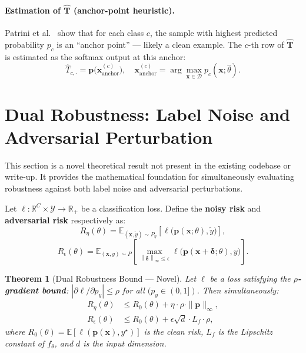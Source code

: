 \documentclass[11pt,a4paper]{article}
\newtheorem{theorem}{Theorem}[section]
\newcommand{\R}{\mathbb{R}}
\newcommand{\E}{\mathbb{E}}
\newcommand{\norm}[1]{\left\|#1\right\|}
\newcommand{\abs}[1]{\left|#1\right|}
\newcommand{\pb}{\mathbf{p}}
\newcommand{\xb}{\mathbf{x}}
\newcommand{\Tb}{\mathbf{T}}
\begin{document}
\paragraph{Estimation of $\hat{\Tb}$ (anchor-point heuristic).}
Patrini et al.\ \cite{patrini2017} show that for each class $c$, the sample with
highest predicted probability $p_c$ is an ``anchor point'' — likely a clean example.
The $c$-th row of $\hat{\Tb}$ is estimated as the softmax output at this anchor:
\[
  \hat T_{c,\cdot} = \pb\big(\xb^{(c)}_{\mathrm{anchor}}\big), \quad
  \xb^{(c)}_{\mathrm{anchor}} = \arg\max_{\xb \in \mathcal{D}} p_c(\xb;\hat\theta).
\]

\section{Dual Robustness: Label Noise and Adversarial Perturbation}
\label{sec:dual}

\begin{tcolorbox}[colback=green!5!white,colframe=green!60!black,title=Novel Contribution]
This section is a novel theoretical result not present in the existing codebase
or write-up. It provides the mathematical foundation for simultaneously evaluating
robustness against both label noise and adversarial perturbations.
\end{tcolorbox}

Let $\ell : \R^C \times \mathcal{Y} \to \R_+$ be a classification loss.
Define the \textbf{noisy risk} and \textbf{adversarial risk} respectively as:
\[
  R_\eta(\theta) = \E_{(\xb,\tilde y)\sim P_\eta}\!\left[\ell\big(\pb(\xb;\theta),\tilde y\big)\right],
\]
\[
  R_\epsilon(\theta) = \E_{(\xb,y)\sim P}\!\left[\max_{\norm{\boldsymbol{\delta}}_\infty \leq \epsilon}
  \ell\big(\pb(\xb+\boldsymbol{\delta};\theta),y\big)\right].
\]

\begin{theorem}[Dual Robustness Bound — Novel]
\label{thm:dual}
Let $\ell$ be a loss satisfying the \textbf{$\rho$-gradient bound}:
$\abs{\partial\ell/\partial p_y} \leq \rho$ for all $(p_y \in (0,1])$.
Then simultaneously:
\begin{align}
  R_\eta(\theta) &\leq R_0(\theta) + \eta \cdot \rho \cdot \|\pb\|_\infty, \label{eq:noise-bound}\\
  R_\epsilon(\theta) &\leq R_0(\theta) + \epsilon\sqrt{d}\cdot L_f \cdot \rho, \label{eq:adv-bound}
\end{align}
where $R_0(\theta) = \E[\ell(\pb(\xb),y^\star)]$ is the clean risk, $L_f$ is the
Lipschitz constant of $f_\theta$, and $d$ is the input dimension.
\end{theorem}
\end{document}
